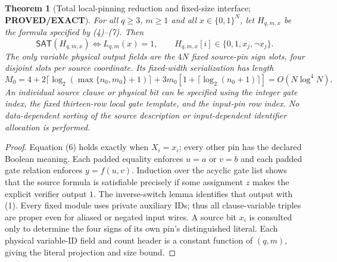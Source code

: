 \documentclass[11pt]{article}
\newtheorem{theorem}{Theorem}
\newcommand{\SAT}{\mathsf{SAT}}
\begin{document}
\begin{theorem}[Total local-pinning reduction and fixed-size interface;
\textbf{PROVED/EXACT}]
For all $q\ge3$, $m\ge1$ and all $x\in\{0,1\}^N$, let $H_{q,m,x}$ be
the formula specified by (4)--(7). Then
\[
 \boxed{\SAT(H_{q,m,x})\iff L_{q,m}(x)=1,}\qquad
 H_{q,m,x}[i]\in\{0,1,x_j,\neg x_j\}.\tag{8}
\]
The only variable physical output fields are the $4N$ fixed source-pin
sign slots, four disjoint slots per source coordinate. Its fixed-width
serialization has length
\[
 M_0=4+2\lceil\log_2(\max\{n_0,m_0\}+1)\rceil
 +3m_0[1+\lceil\log_2(n_0+1)\rceil]
 =O(N\log^4N).\tag{9}
\]
An individual source clause or physical bit can be specified using the
integer gate index, the fixed thirteen-row local gate template, and the
input-pin row index. No data-dependent sorting of the source description
or input-dependent identifier allocation is performed.
\end{theorem}
\begin{proof}
Equation (6) holds exactly when $X_i=x_i$; every other pin has the
declared Boolean meaning. Each padded equality enforces $u=a$ or
$v=b$ and each padded gate relation enforces $y=f(u,v)$. Induction over
the acyclic gate list shows that the source formula is satisfiable
precisely if some assignment $z$ makes the explicit verifier output $1$.
The inverse-switch lemma identifies that output with (1). Every fixed
module uses private auxiliary IDs; thus all clause-variable triples are
proper even for aliased or negated input wires. A source bit $x_i$ is
consulted only to determine the four signs of its own pin's distinguished
literal. Each physical variable-ID field and count header is a constant
function of $(q,m)$, giving the literal projection and size bound.
\end{proof}
\end{document}
